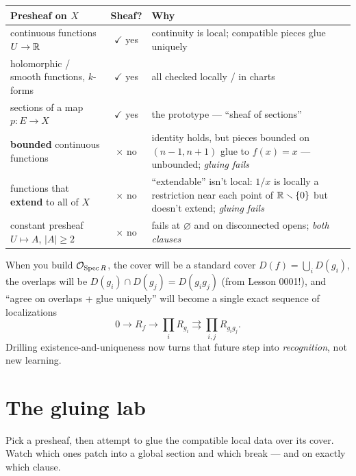 \begin{center}
\begin{tabular}{@{}L{5.1cm}cL{6.6cm}@{}}
\toprule
Presheaf on $X$ & Sheaf? & Why\\
\midrule
continuous functions $U\to\mathbb{R}$ & \textcolor{good}{$\checkmark$ yes} &
  continuity is local; compatible pieces glue uniquely\\[2pt]
holomorphic / smooth functions, $k$-forms & \textcolor{good}{$\checkmark$ yes} &
  all checked locally / in charts\\[2pt]
sections of a map $p\colon E\to X$ & \textcolor{good}{$\checkmark$ yes} &
  the prototype --- ``sheaf of sections''\\[2pt]
\textbf{bounded} continuous functions & \textcolor{bad}{$\times$ no} &
  identity holds, but pieces bounded on $(n{-}1,n{+}1)$ glue to $f(x)=x$ --- unbounded;
  \emph{gluing fails}\\[2pt]
functions that \textbf{extend} to all of $X$ & \textcolor{bad}{$\times$ no} &
  ``extendable'' isn't local: $1/x$ is locally a restriction near each point of $\mathbb{R}\smallsetminus\{0\}$
  but doesn't extend; \emph{gluing fails}\\[2pt]
constant presheaf $U\mapsto A$, $|A|\ge2$ & \textcolor{bad}{$\times$ no} &
  fails at $\varnothing$ and on disconnected opens; \emph{both clauses}\\
\bottomrule
\end{tabular}
\end{center}

\begin{intubox}
When you build $\mathcal{O}_{\operatorname{Spec} R}$, the cover will be a standard cover $D(f)=\bigcup_i D(g_i)$, the
overlaps will be $D(g_i)\cap D(g_j)=D(g_ig_j)$ (from Lesson 0001!), and ``agree on overlaps + glue
uniquely'' will become a single exact sequence of localizations
\[
  0\to R_f\to\textstyle\prod_i R_{g_i}\rightrightarrows\prod_{i,j} R_{g_ig_j}.
\]
Drilling existence-and-uniqueness now turns that future step into \emph{recognition}, not new
learning.
\end{intubox}

\section{The gluing lab}
Pick a presheaf, then attempt to glue the compatible local data over its cover. Watch which ones
patch into a global section and which break --- and on exactly which clause.

